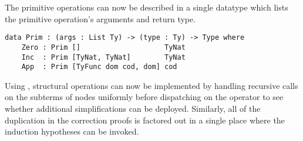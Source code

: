 The primitive operations can now be described in a single datatype  which lists the primitive operation's arguments and return type.

\begin{comment}
\IdrisData{Zero}---which takes no argument and returns a term of type \IdrisData{TyNat};
%
\IdrisData{And}---which takes two arguments of type \IdrisData{TyBool} and return a term
of type \IdrisData{TyBool};
%
and
%
\IdrisData{App}---which takes a function and an argument that corresponds to the type of the function's domain and returns a term that is the type of the function's co-domain.
\end{comment}

\begin{Verbatim}
data Prim : (args : List Ty) -> (type : Ty) -> Type where
    Zero : Prim []                    TyNat
    Inc  : Prim [TyNat, TyNat]        TyNat
    App  : Prim [TyFunc dom cod, dom] cod
\end{Verbatim}

Using , structural operations can now be implemented by handling recursive calls on the subterms of  nodes uniformly before dispatching on the operator to see whether additional simplifications can be deployed.
%
Similarly, all of the duplication in the correction proofs is factored out in a single place where the induction hypotheses can be invoked.

